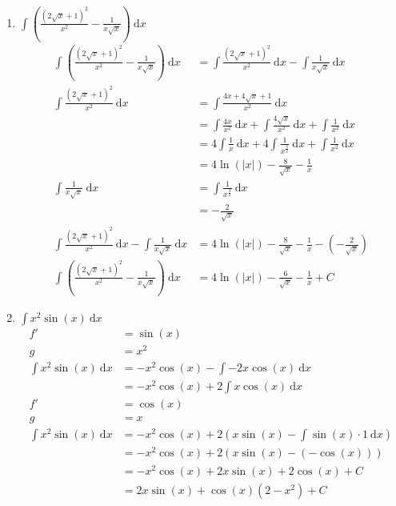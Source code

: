 \documentclass[10pt]{article}
\begin{document}
\begin{enumerate}[start=5,leftmargin=1in]
\begin{enumerate}
        \item $\int \left(\frac{(2 \sqrt{x} + 1)^2}{x^2} - \frac{1}{x \sqrt{x}}\right) \: \text{d}x$
        \begin{align*}
            \int \left(\frac{(2 \sqrt{x} + 1)^2}{x^2} - \frac{1}{x \sqrt{x}}\right) \: \text{d}x &= \int \frac{(2 \sqrt{x} + 1)^2}{x^2} \: \text{d}x - \int \frac{1}{x \sqrt{x}} \: \text{d}x \\
            \int \frac{(2 \sqrt{x} + 1)^2}{x^2} \: \text{d}x &= \int \frac{4x + 4\sqrt{x} + 1}{x^2} \: \text{d}x \\
            &= \int \frac{4x}{x^2} \: \text{d}x + \int \frac{4\sqrt{x}}{x^2} \: \text{d}x + \int \frac{1}{x^2} \: \text{d}x \\
            &= 4 \int \frac{1}{x} \: \text{d}x + 4 \int \frac{1}{x^{\frac{3}{2}}} \: \text{d}x + \int \frac{1}{x^2} \: \text{d}x \\
            &= 4 \ln(|x|) - \frac{8}{\sqrt{x}} - \frac{1}{x} \\
            \int \frac{1}{x \sqrt{x}} \: \text{d}x &= \int \frac{1}{x^{\frac{3}{2}}} \: \text{d}x \\
            &= - \frac{2}{\sqrt{x}} \\
            \int \frac{(2 \sqrt{x} + 1)^2}{x^2} \: \text{d}x - \int \frac{1}{x \sqrt{x}} \: \text{d}x &= 4 \ln(|x|) - \frac{8}{\sqrt{x}} - \frac{1}{x} - \left(-\frac{2}{\sqrt{x}}\right) \\
            \int \left(\frac{(2 \sqrt{x} + 1)^2}{x^2} - \frac{1}{x \sqrt{x}}\right) \: \text{d}x &= 4 \ln(|x|) - \frac{6}{\sqrt{x}} - \frac{1}{x} + C
        \end{align*}

        \item $\int x^2 \sin(x) \: \text{d}x$
        \begin{align*}
            f' &= \sin(x) \\
            g &= x^2 \\
            \int x^2 \sin(x) \: \text{d}x &= - x^2 \cos(x) - \int - 2x \cos(x) \: \text{d}x \\
            &= - x^2 \cos(x) + 2 \int x \cos(x) \: \text{d}x \\
            f' &= \cos(x) \\
            g &= x \\
            \int x^2 \sin(x) \: \text{d}x &= - x^2 \cos(x) + 2 (x \sin(x) - \int \sin(x) \cdot 1 \: \text{d}x) \\
            &= - x^2 \cos(x) + 2 (x \sin(x) - (- \cos(x))) \\
            &= - x^2 \cos(x) + 2 x \sin(x) + 2 \cos(x) + C \\
            &= 2 x \sin(x) + \cos(x) (2 - x^2) + C
        \end{align*}


\end{enumerate}
\end{enumerate}
\end{document}

